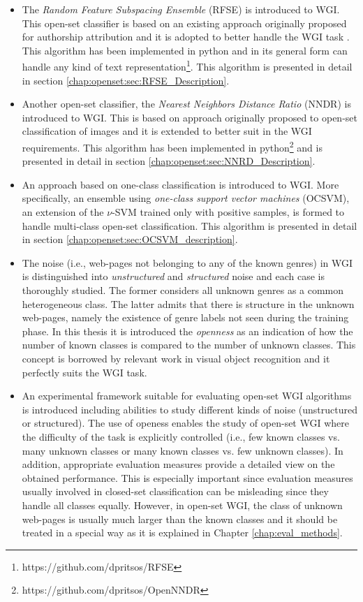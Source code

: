 \begin{itemize}
\item The \textit{Random Feature Subspacing Ensemble} (RFSE) is introduced to WGI. This open-set classifier is based on an existing approach originally proposed for authorship attribution and it is adopted to better handle the WGI task \parencite{koppel2011authorship}. This algorithm has been implemented in python and in its general form can handle any kind of text representation\footnote{https://github.com/dpritsos/RFSE}. This algorithm is presented in detail in section \ref{chap:openset:sec:RFSE_Description}.
\item Another open-set classifier, the \textit{Nearest Neighbors Distance Ratio} (NNDR) is introduced to WGI. This is based on approach originally proposed to open-set classification of images \parencite{mendesjunior2016} and it is extended to better suit in the WGI requirements. This algorithm has been implemented in python\footnote{https://github.com/dpritsos/OpenNNDR} and is presented in detail in section \ref{chap:openset:sec:NNRD_Description}.
\item An approach based on one-class classification is introduced to WGI. More specifically, an ensemble using \textit{one-class support vector machines} (OCSVM), an extension of the $\nu$-SVM trained only with positive samples, is formed to handle multi-class open-set classification. This algorithm is presented in detail in section \ref{chap:openset:sec:OCSVM_description}.
\item The noise (i.e., web-pages not belonging to any of the known genres) in WGI is distinguished into \textit{unstructured} and \textit{structured} noise and each case is thoroughly studied. The former considers all unknown genres as a common heterogeneous class. The latter admits that there is structure in the unknown web-pages, namely the existence of genre labels not seen during the training phase. In this thesis it is introduced the \textit{openness} as an indication of how the number of known classes is compared to the number of unknown classes. This concept is borrowed by relevant work in visual object recognition \parencite{scheirer2013toward} and it perfectly suits the WGI task.
\item An experimental framework suitable for evaluating open-set WGI algorithms is introduced including abilities to study different kinds of noise (unstructured or structured). The use of openess enables the study of open-set WGI where the difficulty of the task is explicitly controlled (i.e., few known classes vs. many unknown classes or many known classes vs. few unknown classes). In addition, appropriate evaluation measures provide a detailed view on the obtained performance. This is especially important since evaluation measures usually involved in closed-set classification can be misleading since they handle all classes equally. However, in open-set WGI, the class of unknown web-pages is usually much larger than the known classes and it should be treated in a special way as it is explained in Chapter \ref{chap:eval_methods}. 

\end{itemize}

